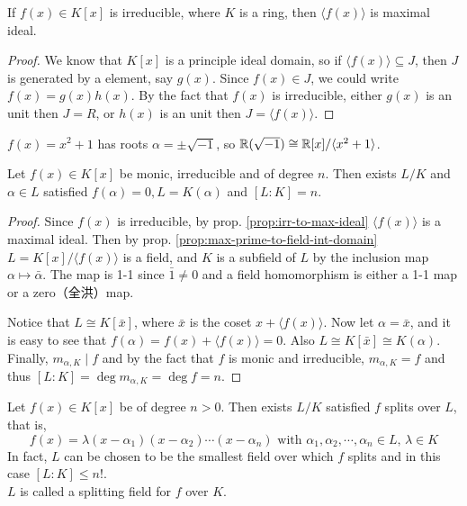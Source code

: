\begin{prop} \label{prop:irr-to-max-ideal}
  If $f(x) \in K[x]$ is irreducible, where $K$ is a ring, then $\langle f(x) \rangle$ is maximal ideal.
  \begin{proof}
    We know that $K[x]$ is a principle ideal domain, so if $\langle f(x) \rangle \subseteq J$, then
    $J$ is generated by a element, say $g(x)$. Since $f(x) \in J$, we could write $f(x) = g(x) h(x)$.
    By the fact that $f(x)$ is irreducible, either $g(x)$ is an unit then $J = R$, or $h(x)$ is
    an unit then $J = \langle f(x) \rangle$.
  \end{proof}
\end{prop}

\begin{example}
  $f(x) = x^2 + 1$ has roots $\alpha = \pm \sqrt{-1}$, so $\mathbb{R}(\sqrt{-1}) \cong \mathbb{R}[x] / \langle x^2 + 1 \rangle$.
\end{example}

\begin{theorem} \label{thm:field-ext-1}
  Let $f(x) \in K[x]$ be monic, irreducible and of degree $n$. Then exists $L / K$ and $\alpha \in L$
  satisfied $f(\alpha) = 0, L = K(\alpha)$ and $[L: K] = n$.
\end{theorem}

\begin{proof}
  Since $f(x)$ is irreducible, by prop. \ref{prop:irr-to-max-ideal} $\langle f(x) \rangle$ is a maximal ideal.
  Then by prop. \ref{prop:max-prime-to-field-int-domain} $L = K[x] / \langle f(x) \rangle$ is a field, and $K$ is a subfield
  of $L$ by the inclusion map $\alpha \mapsto \bar\alpha$. The map is 1-1 since $\bar{1} \neq 0$ and
  a field homomorphism is either a 1-1 map or a zero（全洪）map.

  Notice that $L \cong K[\bar{x}]$, where $\bar{x}$ is the coset $x + \langle f(x) \rangle$.
  Now let $\alpha = \bar{x}$, and it is easy to see that $f(\alpha) = f(x) + \langle f(x) \rangle = 0$.
  Also $L \cong K[\bar{x}] \cong K(\alpha)$. Finally, $m_{\alpha, K} \mid f$ and by the fact that
  $f$ is monic and irreducible, $m_{\alpha, K} = f$ and thus $[L: K] = \deg m_{\alpha, K} = \deg f = n$.
\end{proof}

\begin{theorem}
  Let $f(x) \in K[x]$ be of degree $n > 0$. Then exists $L/K$ satisfied $f$ splits over $L$,
  that is,
  \[ f(x) = \lambda (x - \alpha_1) (x - \alpha_2) \cdots (x - \alpha_n) \text{ with }
    \alpha_1, \alpha_2, \cdots, \alpha_n \in L,\, \lambda \in K \]
  In fact, $L$ can be chosen to be the smallest field over which $f$ splits and in this case $[L : K] \leq n!$.\\
  $L$ is called a splitting field for $f$ over $K$.
\end{theorem}

